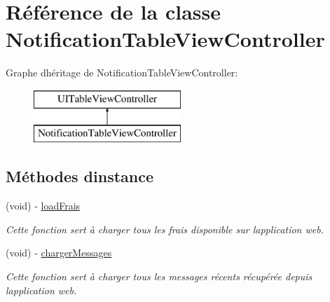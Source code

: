 \hypertarget{interface_notification_table_view_controller}{}\section{Référence de la classe Notification\+Table\+View\+Controller}
\label{interface_notification_table_view_controller}
Graphe d\textquotesingle{}héritage de Notification\+Table\+View\+Controller\+:\begin{figure}[H]
\begin{center}
\leavevmode
\includegraphics[height=2.000000cm]{interface_notification_table_view_controller}
\end{center}
\end{figure}
\subsection*{Méthodes d\textquotesingle{}instance}
\begin{DoxyCompactItemize}
\item 
(void) -\/ \hyperlink{interface_notification_table_view_controller_a189bbd0cad3d343e9253bbdbaddcf38f}{load\+Frais}
\begin{DoxyCompactList}\small\item\em Cette fonction sert à charger tous les frais disponible sur l\textquotesingle{}application web. \end{DoxyCompactList}\item 
(void) -\/ \hyperlink{interface_notification_table_view_controller_aadc1fcf084d1dce03be89a3854285afd}{charger\+Messages}
\begin{DoxyCompactList}\small\item\em Cette fonction sert à charger tous les messages récents récupérée depuis l\textquotesingle{}application web. \end{DoxyCompactList}\end{DoxyCompactItemize}
